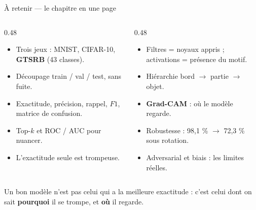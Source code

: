\begin{frame}{À retenir --- le chapitre en une page}
\begin{columns}[t]
\begin{column}{0.48\textwidth}
\begin{kbox}[Évaluer]
\begin{itemize}
  \item Trois jeux : MNIST, CIFAR-10, \textbf{GTSRB} (43 classes).
  \item Découpage train / val / test, sans fuite.
  \item Exactitude, précision, rappel, $F1$, matrice de confusion.
  \item Top-$k$ et ROC / AUC pour nuancer.
  \item L'exactitude seule est trompeuse.
\end{itemize}
\end{kbox}
\end{column}
\begin{column}{0.48\textwidth}
\begin{kbox}
\begin{itemize}
  \item Filtres = noyaux appris ; activations = présence du motif.
  \item Hiérarchie bord $\to$ partie $\to$ objet.
  \item \textbf{Grad-CAM} : où le modèle regarde.
  \item Robustesse : 98,1 \% $\to$ 72,3 \% sous rotation.
  \item Adversarial et biais : les limites réelles.
\end{itemize}
\end{kbox}
\end{column}
\end{columns}
\vspace{1mm}
\begin{ebox}
Un bon modèle n'est pas celui qui a la meilleure exactitude : c'est celui dont on
sait \textbf{pourquoi} il se trompe, et \textbf{où} il regarde.
\end{ebox}
\end{frame}

